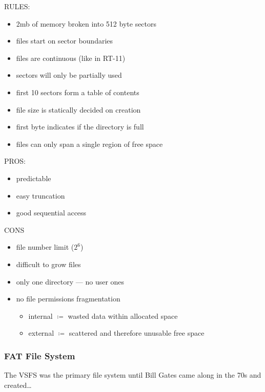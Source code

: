 \documentclass[../../lecture_notes.tex]{subfiles}
\begin{document}
RULES:
	\begin{itemize}
		\item 2mb of memory broken into 512 byte sectors
		\item files start on sector boundaries
		\item files are continuous (like in RT-11)
		\item sectors will only be partially used
		\item first 10 sectors form a table of contents
		\item file size is statically decided on creation
		\item first byte indicates if the directory is full
		\item files can only span a single region of free space
	\end{itemize}
PROS:
	\begin{itemize}
		\item predictable
		\item easy truncation
		\item good sequential access
	\end{itemize}
CONS
	\begin{itemize}
		\item file number limit ($2^6$)
		\item difficult to grow files
		\item only one directory — no user ones
		\item no file permissions
		fragmentation
			\begin{itemize}
				\item internal $\coloneqq$ wasted data within allocated space
				\item external $\coloneqq$ scattered and therefore unusable free space
			\end{itemize}
	\end{itemize}


\subsubsection{FAT File System}

The VSFS was the primary file system until Bill Gates came along in the 70s and created…
\end{document}
